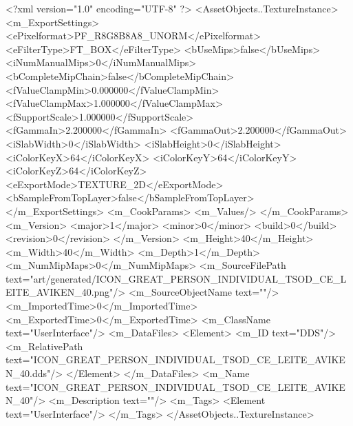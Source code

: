 <?xml version="1.0" encoding="UTF-8" ?>
<AssetObjects..TextureInstance>
	<m_ExportSettings>
		<ePixelformat>PF_R8G8B8A8_UNORM</ePixelformat>
		<eFilterType>FT_BOX</eFilterType>
		<bUseMips>false</bUseMips>
		<iNumManualMips>0</iNumManualMips>
		<bCompleteMipChain>false</bCompleteMipChain>
		<fValueClampMin>0.000000</fValueClampMin>
		<fValueClampMax>1.000000</fValueClampMax>
		<fSupportScale>1.000000</fSupportScale>
		<fGammaIn>2.200000</fGammaIn>
		<fGammaOut>2.200000</fGammaOut>
		<iSlabWidth>0</iSlabWidth>
		<iSlabHeight>0</iSlabHeight>
		<iColorKeyX>64</iColorKeyX>
		<iColorKeyY>64</iColorKeyY>
		<iColorKeyZ>64</iColorKeyZ>
		<eExportMode>TEXTURE_2D</eExportMode>
		<bSampleFromTopLayer>false</bSampleFromTopLayer>
	</m_ExportSettings>
	<m_CookParams>
		<m_Values/>
	</m_CookParams>
	<m_Version>
		<major>1</major>
		<minor>0</minor>
		<build>0</build>
		<revision>0</revision>
	</m_Version>
	<m_Height>40</m_Height>
	<m_Width>40</m_Width>
	<m_Depth>1</m_Depth>
	<m_NumMipMaps>0</m_NumMipMaps>
	<m_SourceFilePath text="art/generated/ICON_GREAT_PERSON_INDIVIDUAL_TSOD_CE_LEITE_AVIKEN_40.png"/>
	<m_SourceObjectName text=""/>
	<m_ImportedTime>0</m_ImportedTime>
	<m_ExportedTime>0</m_ExportedTime>
	<m_ClassName text="UserInterface"/>
	<m_DataFiles>
		<Element>
			<m_ID text="DDS"/>
			<m_RelativePath text="ICON_GREAT_PERSON_INDIVIDUAL_TSOD_CE_LEITE_AVIKEN_40.dds"/>
		</Element>
	</m_DataFiles>
	<m_Name text="ICON_GREAT_PERSON_INDIVIDUAL_TSOD_CE_LEITE_AVIKEN_40"/>
	<m_Description text=""/>
	<m_Tags>
		<Element text="UserInterface"/>
	</m_Tags>
</AssetObjects..TextureInstance>
